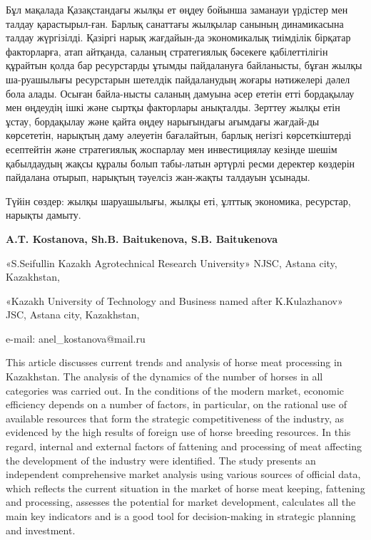 Бұл мақалада Қазақстандағы жылқы ет өңдеу бойынша заманауи үрдістер мен
талдау қарастырыл-ған. Барлық санаттағы жылқылар санының динамикасына
талдау жүргізілді. Қазіргі нарық жағдайын-да экономикалық тиімділік
бірқатар факторларға, атап айтқанда, саланың стратегиялық бәсекеге
қабілеттілігін құрайтын қолда бар ресурстарды ұтымды пайдалануға
байланысты, бұған жылқы ша-руашылығы ресурстарын шетелдік пайдаланудың
жоғары нәтижелері дәлел бола алады. Осыған байла-нысты саланың дамуына
әсер ететін етті бордақылау мен өңдеудің ішкі және сыртқы факторлары
анықталды. Зерттеу жылқы етін ұстау, бордақылау және қайта өңдеу
нарығындағы ағымдағы жағдай-ды көрсететін, нарықтың даму әлеуетін
бағалайтын, барлық негізгі көрсеткіштерді есептейтін және стратегиялық
жоспарлау мен инвестициялау кезінде шешім қабылдаудың жақсы құралы болып
табы-латын әртүрлі ресми деректер көздерін пайдалана отырып, нарықтың
тәуелсіз жан-жақты талдауын ұсынады.

Түйін сөздер: жылқы шаруашылығы, жылқы еті, ұлттық экономика, ресурстар,
нарықты дамыту.

\begin{center}

{\bfseries A.T. Kostanova\envelope, Sh.B. Baitukenova, S.B.
Baitukenova}

«S.Seifullin Kazakh Agrotechnical Research University» NJSC, Astana city, Kazakhstan,

«Kazakh University of Technology and Business named after K.Kulazhanov» JSC, Astana city, Kazakhstan,

e-mail: anel\_kostanova@mail.ru
\end{center}

This article discusses current trends and analysis of horse meat
processing in Kazakhstan. The analysis of the dynamics of the number of
horses in all categories was carried out. In the conditions of the
modern market, economic efficiency depends on a number of factors, in
particular, on the rational use of available resources that form the
strategic competitiveness of the industry, as evidenced by the high
results of foreign use of horse breeding resources. In this regard,
internal and external factors of fattening and processing of meat
affecting the development of the industry were identified. The study
presents an independent comprehensive market analysis using various
sources of official data, which reflects the current situation in the
market of horse meat keeping, fattening and processing, assesses the
potential for market development, calculates all the main key indicators
and is a good tool for decision-making in strategic planning and
investment.

